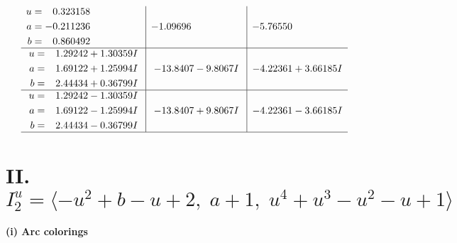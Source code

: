 \documentclass[1p]{elsarticle_modified}
\theoremstyle{definition}
\begin{document}
$$\begin{array}{c|c|c}
\begin{aligned}
u &= \phantom{-}0.323158\phantom{ +0.000000I} \\
a &= -0.211236\phantom{ +0.000000I} \\
b &= \phantom{-}0.860492\phantom{ +0.000000I}\end{aligned}
 & -1.09696\phantom{ +0.000000I} & -5.76550\phantom{ +0.000000I} \\ \hline\begin{aligned}
u &= \phantom{-}1.29242 + 1.30359 I \\
a &= \phantom{-}1.69122 + 1.25994 I \\
b &= \phantom{-}2.44434 + 0.36799 I\end{aligned}
 & -13.8407 - 9.8067 I & -4.22361 + 3.66185 I \\ \hline\begin{aligned}
u &= \phantom{-}1.29242 - 1.30359 I \\
a &= \phantom{-}1.69122 - 1.25994 I \\
b &= \phantom{-}2.44434 - 0.36799 I\end{aligned}
 & -13.8407 + 9.8067 I & -4.22361 - 3.66185 I\\
 \hline 
 \end{array}$$\newpage\newpage\renewcommand{\arraystretch}{1}
\centering \section*{II. $I^u_{2}= \langle - u^2+b- u+2,\;a+1,\;u^4+u^3- u^2- u+1 \rangle$}
\flushleft \textbf{(i) Arc colorings}\\
\end{document}
